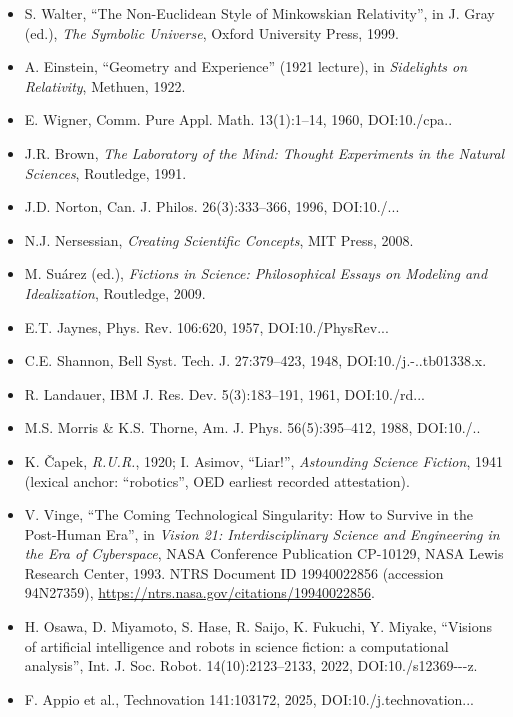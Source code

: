 \documentclass[11pt,a4paper]{article}
\begin{document}
\begin{itemize}[leftmargin=1.6em,itemsep=2pt,parsep=0pt,topsep=3pt]
\item[R01.] S. Walter, ``The Non-Euclidean Style of Minkowskian Relativity'', in J. Gray (ed.), \textit{The Symbolic Universe}, Oxford University Press, 1999.
\item[R02.] A. Einstein, ``Geometry and Experience'' (1921 lecture), in \textit{Sidelights on Relativity}, Methuen, 1922.
\item[R03.] E. Wigner, Comm. Pure Appl. Math. 13(1):1–14, 1960, DOI:10./\allowbreak cpa..\allowbreak 
\item[R04.] J.R. Brown, \textit{The Laboratory of the Mind: Thought Experiments in the Natural Sciences}, Routledge, 1991.
\item[R05.] J.D. Norton, Can. J. Philos. 26(3):333–366, 1996, DOI:10./...\allowbreak 
\item[R06.] N.J. Nersessian, \textit{Creating Scientific Concepts}, MIT Press, 2008.
\item[R07.] M. Suárez (ed.), \textit{Fictions in Science: Philosophical Essays on Modeling and Idealization}, Routledge, 2009.
\item[R08.] E.T. Jaynes, Phys. Rev. 106:620, 1957, DOI:10./\allowbreak PhysRev...\allowbreak 
\item[R09.] C.E. Shannon, Bell Syst. Tech. J. 27:379–423, 1948, DOI:10./\allowbreak j.-..\allowbreak tb01338.\allowbreak x.\allowbreak 
\item[R10.] R. Landauer, IBM J. Res. Dev. 5(3):183–191, 1961, DOI:10./\allowbreak rd...\allowbreak 
\item[R11.] M.S. Morris \& K.S. Thorne, Am. J. Phys. 56(5):395–412, 1988, DOI:10./..\allowbreak 
\item[R12.] K. Čapek, \textit{R.U.R.}, 1920; I. Asimov, ``Liar!'', \textit{Astounding Science Fiction}, 1941 (lexical anchor: ``robotics'', OED earliest recorded attestation).
\item[R13.] V. Vinge, ``The Coming Technological Singularity: How to Survive in the Post-Human Era'', in \textit{Vision 21: Interdisciplinary Science and Engineering in the Era of Cyberspace}, NASA Conference Publication CP-10129, NASA Lewis Research Center, 1993. NTRS Document ID 19940022856 (accession 94N27359), \url{https://ntrs.nasa.gov/citations/19940022856}.
\item[R14.] H. Osawa, D. Miyamoto, S. Hase, R. Saijo, K. Fukuchi, Y. Miyake, ``Visions of artificial intelligence and robots in science fiction: a computational analysis'', Int. J. Soc. Robot. 14(10):2123–2133, 2022, DOI:10./\allowbreak s12369---\allowbreak z.\allowbreak 
\item[R15.] F. Appio et al., Technovation 141:103172, 2025, DOI:10./\allowbreak j.\allowbreak technovation...\allowbreak 
\end{itemize}
\end{document}
